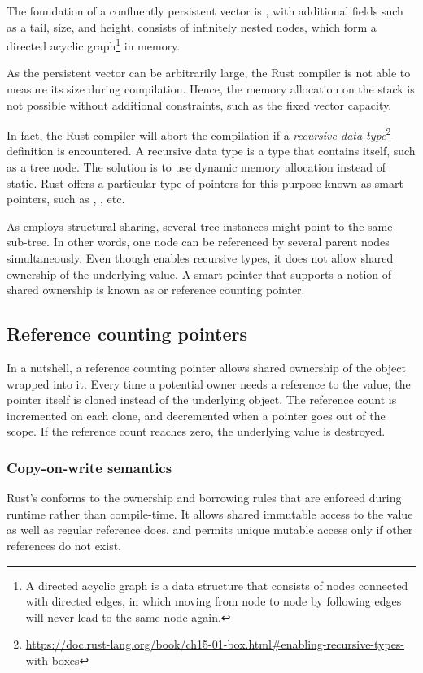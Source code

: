 The foundation of a confluently persistent vector is \rrbtree{}, with additional fields such as a tail, size, and height. \rrbtree{} consists of infinitely nested nodes, which form a directed acyclic graph\footnote{A directed acyclic graph is a data structure that consists of nodes connected with directed edges, in which moving from node to node by following edges will never lead to the same node again.} in memory.

As the persistent vector can be arbitrarily large, the Rust compiler is not able to measure its size during compilation. Hence, the memory allocation on the stack is not possible without additional constraints, such as the fixed vector capacity.

In fact, the Rust compiler will abort the compilation if a \emph{recursive data type}\footnote{\url{https://doc.rust-lang.org/book/ch15-01-box.html\#enabling-recursive-types-with-boxes}} definition is encountered. A recursive data type is a type that contains itself, such as a tree node. The solution is to use dynamic memory allocation instead of static. Rust offers a particular type of pointers for this purpose known as smart pointers, such as \boxptr{}, \rc{}, etc.

As \rrbtree{} employs structural sharing, several tree instances might point to the same sub-tree. In other words, one node can be referenced by several parent nodes simultaneously. Even though \boxptr{} enables recursive types, it does not allow shared ownership of the underlying value. A smart pointer that supports a notion of shared ownership is known as \rc{} or reference counting pointer.

\subsection{Reference counting pointers}
In a nutshell, a reference counting pointer allows shared ownership of the object wrapped into it. Every time a potential owner needs a reference to the value, the pointer itself is cloned instead of the underlying object. The reference count is incremented on each clone, and decremented when a pointer goes out of the scope. If the reference count reaches zero, the underlying value is destroyed.

\subsubsection*{Copy-on-write semantics}
Rust’s \rc{} conforms to the ownership and borrowing rules that are enforced during runtime rather than compile-time. It allows shared immutable access to the value as well as regular reference does, and permits unique mutable access only if other references do not exist.

